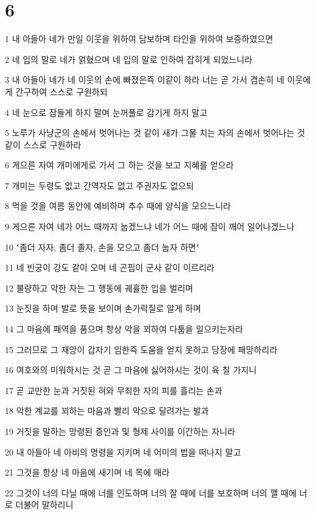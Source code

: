 \chapter{6}

\par 1 내 아들아 네가 만일 이웃을 위하여 담보하며 타인을 위하여 보증하였으면
\par 2 네 입의 말로 네가 얽혔으며 네 입의 말로 인하여 잡히게 되었느니라
\par 3 내 아들아 네가 네 이웃의 손에 빠졌은즉 이같이 하라 너는 곧 가서 겸손히 네 이웃에게 간구하여 스스로 구원하되
\par 4 네 눈으로 잠들게 하지 말며 눈꺼풀로 감기게 하지 말고
\par 5 노루가 사냥군의 손에서 벗어나는 것 같이 새가 그물 치는 자의 손에서 벗어나는 것 같이 스스로 구원하라
\par 6 게으른 자여 개미에게로 가서 그 하는 것을 보고 지혜를 얻으라
\par 7 개미는 두령도 없고 간역자도 없고 주권자도 없으되
\par 8 먹을 것을 여름 동안에 예비하며 추수 때에 양식을 모으느니라
\par 9 게으른 자여 네가 어느 때까지 눕겠느냐 네가 어느 때에 잠이 깨어 일어나겠느나
\par 10 "좀더 자자, 좀더 졸자, 손을 모으고 좀더 눕자 하면"
\par 11 네 빈궁이 강도 같이 오며 네 곤핍이 군사 같이 이르리라
\par 12 불량하고 악한 자는 그 행동에 궤휼한 입을 벌리며
\par 13 눈짓을 하며 발로 뜻을 보이며 손가락질로 알게 하며
\par 14 그 마음에 패역을 품으며 항상 악을 꾀하여 다툼을 일으키는자라
\par 15 그러므로 그 재앙이 갑자기 임한즉 도움을 얻지 못하고 당장에 패망하리라
\par 16 여호와의 미워하시는 것 곧 그 마음에 싫어하시는 것이 육 칠 가지니
\par 17 곧 교만한 눈과 거짓된 혀와 무죄한 자의 피를 흘리는 손과
\par 18 악한 계교를 꾀하는 마음과 빨리 악으로 달려가는 발과
\par 19 거짓을 말하는 망령된 증인과 및 형제 사이를 이간하는 자니라
\par 20 내 아들아 네 아비의 명령을 지키며 네 어미의 법을 떠나지 말고
\par 21 그것을 항상 네 마음에 새기며 네 목에 매라
\par 22 그것이 너의 다닐 때에 너를 인도하며 너의 잘 때에 너를 보호하며 너의 깰 때에 너로 더불어 말하리니
